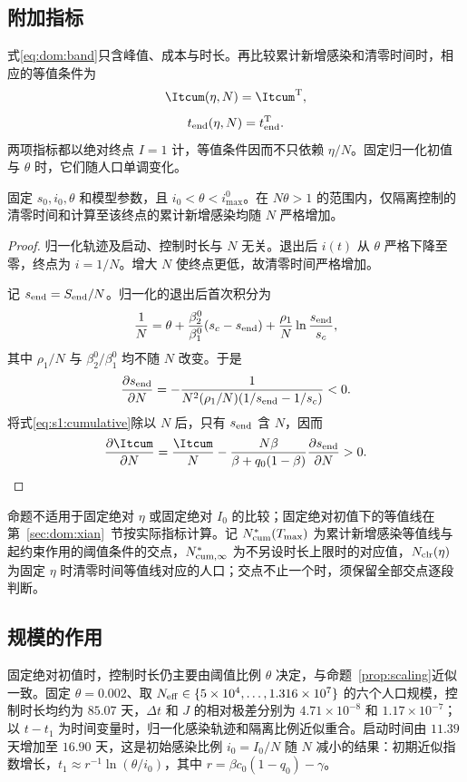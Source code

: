 \subsection{附加指标}
\label{sec:dom:extra}
式\eqref{eq:dom:band}只含峰值、成本与时长。再比较累计新增感染和清零时间时，相应的等值条件为
\begin{equation}
\Itcum(\eta,N)=\Itcum^{\rm T},
\label{eq:dom:cumarc}
\end{equation}
\begin{equation}
t_{\rm end}(\eta,N)=t_{\rm end}^{\rm T}.
\label{eq:dom:clrarc}
\end{equation}
两项指标都以绝对终点 $I=1$ 计，等值条件因而不只依赖 $\eta/N$。固定归一化初值与 $\theta$ 时，它们随人口单调变化。
\begin{proposition}
\label{prop:reference-population}
固定 $s_0,i_0,\theta$ 和模型参数，且 $i_0<\theta<i_{\max}^{0}$。在 $N\theta>1$ 的范围内，仅隔离控制的清零时间和计算至该终点的累计新增感染均随 $N$ 严格增加。
\end{proposition}
\begin{proof}
归一化轨迹及启动、控制时长与 $N$ 无关。退出后 $i(t)$ 从 $\theta$ 严格下降至零，终点为 $i=1/N$。增大 $N$ 使终点更低，故清零时间严格增加。

记 $s_{\rm end}=S_{\rm end}/N$。归一化的退出后首次积分为
\[
\frac1N=\theta+\frac{\beta_2^0}{\beta_1^0}(s_c-s_{\rm end})
+\frac{\rho_1}{N}\ln\frac{s_{\rm end}}{s_c},
\]
其中 $\rho_1/N$ 与 $\beta_2^0/\beta_1^0$ 均不随 $N$ 改变。于是
\[
\frac{\partial s_{\rm end}}{\partial N}
=-\frac1{N^2(\rho_1/N)(1/s_{\rm end}-1/s_c)}<0.
\]
将式\eqref{eq:s1:cumulative}除以 $N$ 后，只有 $s_{\rm end}$ 含 $N$，因而
\[
\frac{\partial\Itcum}{\partial N}
=\frac{\Itcum}{N}
-\frac{N\beta}{\beta+q_0(1-\beta)}\frac{\partial s_{\rm end}}{\partial N}>0.\qedhere
\]
\end{proof}
命题不适用于固定绝对 $\eta$ 或固定绝对 $I_0$ 的比较；固定绝对初值下的等值线在第~\ref{sec:dom:xian}~节按实际指标计算。记 $N^*_{\rm cum}(T_{\max})$ 为累计新增感染等值线与起约束作用的阈值条件的交点，$N^*_{\rm cum,\infty}$ 为不另设时长上限时的对应值，$N_{\rm clr}(\eta)$ 为固定 $\eta$ 时清零时间等值线对应的人口；交点不止一个时，须保留全部交点逐段判断。

\subsection{规模的作用}
\label{sec:scaling}
固定绝对初值时，控制时长仍主要由阈值比例 $\theta$ 决定，与命题~\ref{prop:scaling}近似一致。固定 $\theta=0.002$、取 $N_{\rm eff}\in\{5\times10^4,\dots,1.316\times10^7\}$ 的六个人口规模，控制时长均约为 $85.07$ 天，$\Delta t$ 和 $J$ 的相对极差分别为 $4.71\times10^{-8}$ 和 $1.17\times10^{-7}$；以 $t-t_1$ 为时间变量时，归一化感染轨迹和隔离比例近似重合。启动时间由 $11.39$ 天增加至 $16.90$ 天，这是初始感染比例 $i_0=I_0/N$ 随 $N$ 减小的结果：初期近似指数增长，$t_1\approx r^{-1}\ln(\theta/i_0)$，其中 $r=\beta c_0(1-q_0)-\gamma$。

